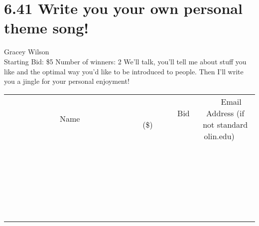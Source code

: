 \documentclass[11pt]{article}
\begin{document}
\section*{6.41 Write you your own personal theme song!}
Gracey Wilson
\\
Starting Bid: \$5
\newline
Number of winners: 2
\newline
We'll talk, you'll tell me about stuff you like and the optimal way you'd like to be introduced to people. Then I'll write you a jingle for your personal enjoyment!
\\[6ex]
\begin{tabular}{c c c}
~~~~~~~~~~~~~Name~~~~~~~~~~~~~ & ~~~~~~~~~Bid (\$)~~~~~~~~~  & ~~~Email Address (if not standard olin.edu)~~~\\
 & & \\
\hline
 & & \\
\hline
 & & \\
\hline
 & & \\
\hline
 & & \\
\hline
 & & \\
\hline
 & & \\
\hline
 & & \\
\hline
 & & \\
\hline
 & & \\
\hline
 & & \\
\hline
 & & \\
\hline
 & & \\
\hline
 & & \\
\hline
 & & \\
\hline
 & & \\
\hline
 & & \\
\hline
 & & \\
\hline
 & & \\
\hline
 & & \\
\hline
 & & \\
\hline
 & & \\
\hline
 & & \\
\hline
 & & \\
\hline
 & & \\
\hline
 & & \\
\hline
\end{tabular}
\newpage
\end{document}
